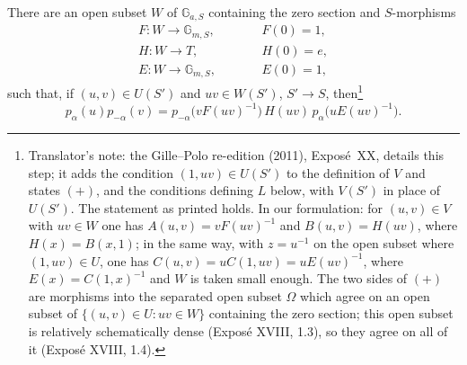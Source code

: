 There are an open subset \(W\) of \(\mathbb G_{a,S}\) containing the
zero section and \(S\)-morphisms
\[
\begin{array}{lll}
  F\colon W\to\mathbb G_{m,S},&\qquad&F(0)=1,\\
  H\colon W\to T,&&H(0)=e,\\
  E\colon W\to\mathbb G_{m,S},&&E(0)=1,
\end{array}
\]
such that, if \((u,v)\in U(S')\) and \(uv\in W(S')\), \(S'\to S\), then\footnote{Translator's note: the Gille--Polo re-edition (2011), Exposé~XX,
details this step; it adds the condition \((1,uv)\in U(S')\) to the definition of \(V\) and states
\((+)\), and the conditions defining \(L\) below, with \(V(S')\) in place of \(U(S')\). The
statement as printed holds. In our formulation: for \((u,v)\in V\) with \(uv\in W\) one has
\(A(u,v)=vF(uv)^{-1}\) and \(B(u,v)=H(uv)\), where \(H(x)=B(x,1)\); in the same way, with
\(z=u^{-1}\) on the open subset where \((1,uv)\in U\), one has \(C(u,v)=uC(1,uv)=uE(uv)^{-1}\),
where \(E(x)=C(1,x)^{-1}\) and \(W\) is taken small enough. The two sides of \((+)\) are morphisms into the separated open subset \(\Omega\)
which agree on an open subset of \(\{(u,v)\in U:uv\in W\}\) containing the zero section; this open
subset is relatively schematically dense \textup{(Exposé XVIII, 1.3)}, so they agree on all of it
\textup{(Exposé XVIII, 1.4)}.}
\begin{equation}\tag{+}
  p_\alpha(u)p_{-\alpha}(v)
    =p_{-\alpha}\bigl(vF(uv)^{-1}\bigr)\,
       H(uv)\,p_\alpha\bigl(uE(uv)^{-1}\bigr).
\end{equation}
